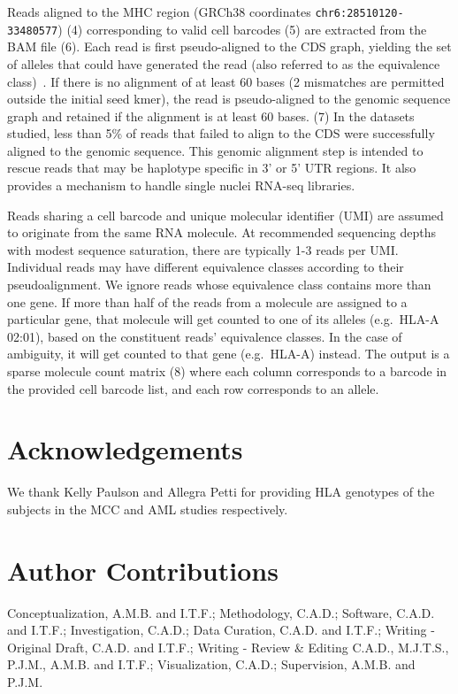 \documentclass{article}[12pt]
\begin{document}
Reads aligned to the MHC region (GRCh38 coordinates \texttt{chr6:28510120-33480577}) (4) corresponding to valid cell barcodes (5) are extracted from the BAM file (6). Each read is first pseudo-aligned to the CDS graph, yielding the set of alleles that could have generated the read (also referred to as the equivalence class)~\cite{Bray2016}. If there is no alignment of at least 60 bases (2 mismatches are permitted outside the initial seed kmer), the read is pseudo-aligned to the genomic sequence graph and retained if the alignment is at least 60 bases. (7) In the datasets studied, less than 5\% of reads that failed to align to the CDS were successfully aligned to the genomic sequence. This genomic alignment step is intended to rescue reads that may be haplotype specific in 3' or 5' UTR regions. It also provides a mechanism to handle single nuclei RNA-seq libraries. 

Reads sharing a cell barcode and unique molecular identifier (UMI) are assumed to originate from the same RNA molecule. At recommended sequencing depths with modest sequence saturation, there are typically 1-3 reads per UMI. Individual reads may have different equivalence classes according to their pseudoalignment. We ignore reads whose equivalence class contains more than one gene. If more than half of the reads from a molecule are assigned to a particular gene, that molecule will get counted to one of its alleles (e.g.~HLA-A 02:01), based on the constituent reads' equivalence classes. In the case of ambiguity, it will get counted to that gene (e.g.~HLA-A) instead. The output is a sparse molecule count matrix (8) where each column corresponds to a barcode in the provided cell barcode list, and each row corresponds to an allele.

\section*{Acknowledgements}

We thank Kelly Paulson and Allegra Petti for providing HLA genotypes of the subjects in the MCC and AML studies respectively.

\section*{Author Contributions}
Conceptualization, A.M.B. and I.T.F.;
Methodology, C.A.D.;
Software, C.A.D. and I.T.F.; 
Investigation, C.A.D.;
Data Curation, C.A.D. and I.T.F.;
Writing - Original Draft, C.A.D. and I.T.F.;
Writing - Review \& Editing C.A.D., M.J.T.S., P.J.M., A.M.B. and I.T.F.;
Visualization, C.A.D.;
Supervision, A.M.B. and P.J.M.
\end{document}
